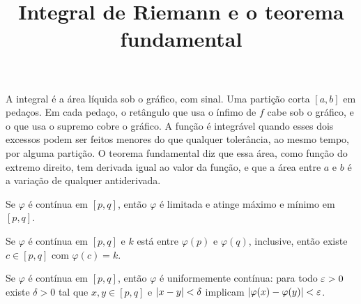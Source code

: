 \documentclass[11pt,a4paper]{article}
\title{Integral de Riemann e o teorema fundamental}
\author{}
\date{}
\begin{document}
\maketitle
\tableofcontents


\begin{intuicao}
A integral é a área líquida sob o gráfico, com sinal. Uma partição corta $[a,b]$ em pedaços. Em cada pedaço, o retângulo que usa o ínfimo de $f$ cabe sob o gráfico, e o que usa o supremo cobre o gráfico. A função é integrável quando esses dois excessos podem ser feitos menores do que qualquer tolerância, ao mesmo tempo, por alguma partição. O teorema fundamental diz que essa área, como função do extremo direito, tem derivada igual ao valor da função, e que a área entre $a$ e $b$ é a variação de qualquer antiderivada.
\end{intuicao}

\begin{teorema}[Weierstrass]\label{teo:weierstrass}
Se $\varphi$ é contínua em $[p,q]$, então $\varphi$ é limitada e atinge máximo e mínimo em $[p,q]$.
\end{teorema}

\begin{teorema}\label{teo:tvi}
Se $\varphi$ é contínua em $[p,q]$ e $k$ está entre $\varphi(p)$ e $\varphi(q)$, inclusive, então existe $c\in[p,q]$ com $\varphi(c)=k$.
\end{teorema}

\begin{teorema}\label{teo:heine}
Se $\varphi$ é contínua em $[p,q]$, então $\varphi$ é uniformemente contínua: para todo $\varepsilon>0$ existe $\delta>0$ tal que $x,y\in[p,q]$ e $\left\lvert x-y \right\rvert<\delta$ implicam $\left\lvert \varphi(x)-\varphi(y) \right\rvert<\varepsilon$.
\end{teorema}
\end{document}
